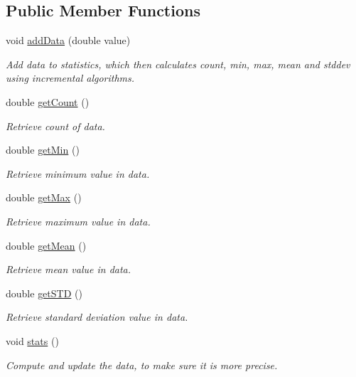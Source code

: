 \subsection*{Public Member Functions}
\begin{DoxyCompactItemize}
\item 
void \hyperlink{interfaceec_1_1_statistics_a8c59a234d776281dd7bd9fb05d0cb12e}{add\+Data} (double value)
\begin{DoxyCompactList}\small\item\em Add data to statistics, which then calculates count, min, max, mean and stddev using incremental algorithms. \end{DoxyCompactList}\item 
double \hyperlink{interfaceec_1_1_statistics_aa9a82f2a37f7f6563106075872bc7af2}{get\+Count} ()
\begin{DoxyCompactList}\small\item\em Retrieve count of data. \end{DoxyCompactList}\item 
double \hyperlink{interfaceec_1_1_statistics_acee86eecccfe2d050c9a13a11f235d8d}{get\+Min} ()
\begin{DoxyCompactList}\small\item\em Retrieve minimum value in data. \end{DoxyCompactList}\item 
double \hyperlink{interfaceec_1_1_statistics_a1cf8e3f12f56957e4133ce4cd07277dc}{get\+Max} ()
\begin{DoxyCompactList}\small\item\em Retrieve maximum value in data. \end{DoxyCompactList}\item 
double \hyperlink{interfaceec_1_1_statistics_aa25ad8afd473f6540041526226d946bd}{get\+Mean} ()
\begin{DoxyCompactList}\small\item\em Retrieve mean value in data. \end{DoxyCompactList}\item 
double \hyperlink{interfaceec_1_1_statistics_a51643b39410b478bc996068eeb48ca0d}{get\+S\+TD} ()
\begin{DoxyCompactList}\small\item\em Retrieve standard deviation value in data. \end{DoxyCompactList}\item 
\mbox{\label{interfaceec_1_1_statistics_a648ce66b63ce750a16af8398c1ea4d8b}} 
void \hyperlink{interfaceec_1_1_statistics_a648ce66b63ce750a16af8398c1ea4d8b}{stats} ()
\begin{DoxyCompactList}\small\item\em Compute and update the data, to make sure it is more precise. \end{DoxyCompactList}\end{DoxyCompactItemize}


